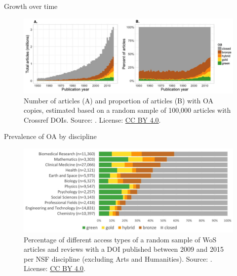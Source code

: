 \documentclass{beamer}
\begin{document}

\begin{frame}{Growth over time}
	\begin{figure}
		\includegraphics[width=\textwidth]{piwowar_et_al_2.jpg}
		\caption{Number of articles (A) and proportion of articles (B) with OA copies, estimated based on a random sample of 100,000 articles with Crossref DOIs. Source: \citet{piwowar_state_2018}. License: \href{https://creativecommons.org/licenses/by/4.0/}{CC BY 4.0}.}
	\end{figure}
\end{frame}


\begin{frame}{Prevalence of OA by discipline}
	\begin{figure}
		\includegraphics[width=\textwidth]{piwowar_et_al_3.jpg}
		\caption{Percentage of different access types of a random sample of WoS articles and reviews with a DOI published between 2009 and 2015 per NSF discipline (excluding Arts and Humanities). Source: \citet{piwowar_state_2018}. License: \href{https://creativecommons.org/licenses/by/4.0/}{CC BY 4.0}.}
	\end{figure}
\end{frame}

\end{document}

